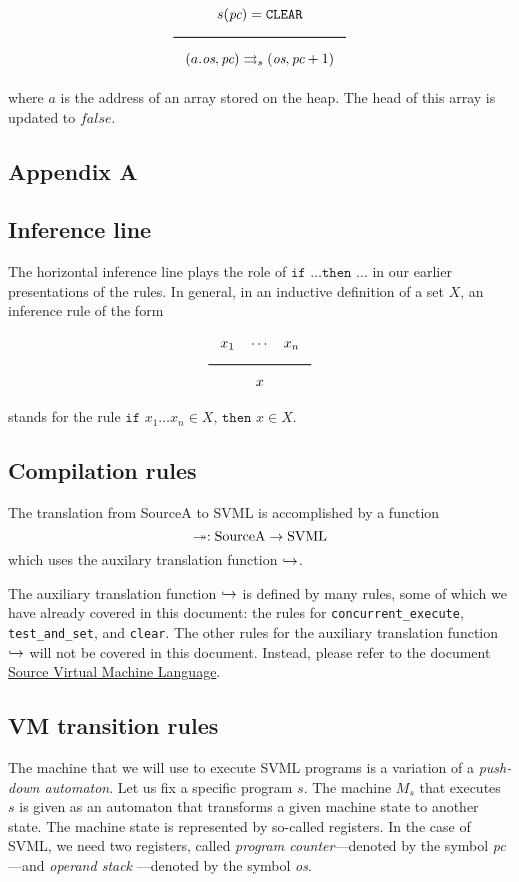 $$\Rule{s(\textit{pc}) = \texttt{CLEAR}}{(a.\textit{os},\textit{pc}) \transition (\textit{os},\textit{pc} + 1)}$$
where \(a\) is the address of an array stored on the heap. The head of this array is updated to \(\textit{false}\).

\begin{appendices}
\section{Appendix A}
\label{sec:orgf83c34f}

\subsection{Inference line}
\label{sec:org548985d}
The horizontal inference line plays the role of \(\texttt{if } \ldots \texttt{then } \ldots\) in our earlier presentations of the rules. In general, in an inductive definition of a set \(X\), an inference rule of the form
$$\Rule{x_1 \quad \cdots \quad x_n}{x}$$
stands for the rule \(\texttt{if } x_1 \ldots x_n\in X \texttt{, then }x \in X\).

\subsection{Compilation rules}
\label{sec:orgf1a6b5a}
The translation from SourceA to SVML is accomplished by a function
$$\twoheadrightarrow: \textrm{SourceA} \rightarrow \textrm{SVML}$$
which uses the auxilary translation function \(\hookrightarrow\).

The auxiliary translation function \(\hookrightarrow\) is defined by many rules, some of which we have already covered in this document: the rules for \texttt{concurrent\_execute}, \texttt{test\_and\_set}, and \texttt{clear}.
The other rules for the auxiliary translation function \(\hookrightarrow\) will not be covered in this document. Instead, please refer to the document \href{svml-spec.pdf}{Source Virtual Machine Language}.

\subsection{VM transition rules}
\label{sec:org8cd92d9}
The machine that we will use to execute SVML programs is a variation of a \emph{push-down automaton}. Let us fix a specific program \(s\). The machine \(M_s\) that executes \(s\) is given as an automaton that transforms a given machine state to another state. The machine state is represented by so-called registers. In the case of SVML, we need two registers, called \emph{program counter}---denoted by the symbol \textit{pc}---and \emph{operand stack} ---denoted by the symbol \textit{os}.


\end{appendices}
